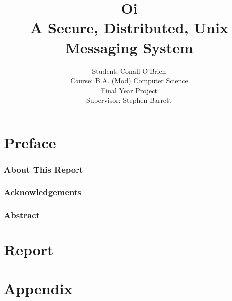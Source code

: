 \documentclass[a4paper,12pt]{report}
\begin{document}


\title{Oi \\ A Secure, Distributed, Unix Messaging System}

\author{Student: Conall O'Brien \\ 
		  Course:  B.A. (Mod) Computer Science \\
		  Final Year Project \\ 
		  Supervisor: Stephen Barrett} 


\date{}
\maketitle


\part*{Preface}


\section{About This Report}



\pagebreak


\section{Acknowledgements}



\pagebreak

\section{Abstract}



\tableofcontents

\listoftables

\listoffigures


\part*{Report}







\part*{Appendix}

\appendix



%



\end{document}
